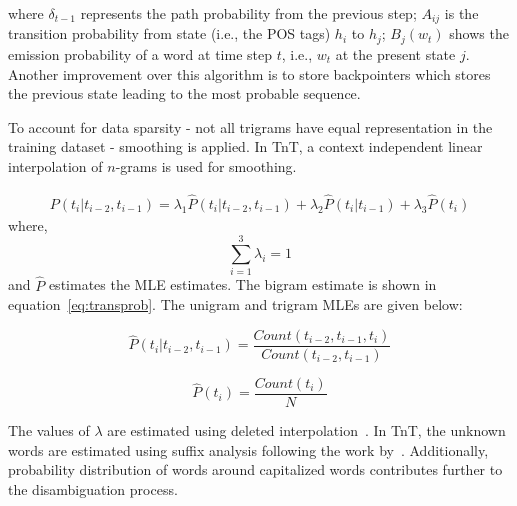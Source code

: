 where $\delta_{t-1}$ represents the path probability from the previous step; $A_{ij}$ is the transition probability from state (i.e., the POS tags) $h_i$ to $h_j$; $B_j(w_t)$ shows the emission probability of a word at time step $t$, i.e., $w_t$ at the present state $j$. Another improvement over this algorithm is to store backpointers which stores the previous state leading to the most probable sequence. ~


To account for data sparsity - not all trigrams have equal representation in the training dataset - smoothing is applied. In TnT, a context independent linear interpolation of $n$-grams is used for smoothing.

\begin{align}
    P(t_i|t_{i-2},t_{i-1}) = \lambda_1 \hat{P}(t_i|t_{i-2},t_{i-1}) + \lambda_2 \hat{P}(t_i|t_{i-1}) + \lambda_3 \hat{P}(t_i)
\end{align}
where, $$\sum_{i=1}^3 \lambda_i = 1$$
and $\hat{P}$ estimates the MLE estimates. The bigram estimate is shown in equation~\ref{eq:transprob}. The unigram and trigram MLEs are given below:

\begin{equation}
    \hat{P}(t_i|t_{i-2},t_{i-1}) = \frac{Count(t_{i-2},t_{i-1},t_i)}{Count(t_{i-2},t_{i-1})}
\end{equation}

\begin{equation}
    \hat{P}(t_i) = \frac{Count(t_i)}{N}
\end{equation}


The values of $\lambda$ are estimated using deleted interpolation~\citep{jelinek1980interpolated}. 
In TnT, the unknown words are estimated using suffix analysis following the work by~\cite{W93-0420}. Additionally, probability distribution of words around capitalized words contributes further to the disambiguation process.~ 



